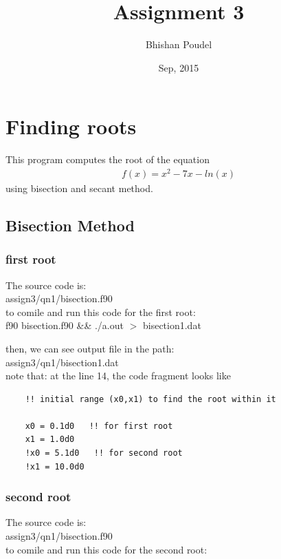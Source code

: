 \documentclass[11pt,a4paper,english]{article}
\title{Assignment 3}
\author{Bhishan Poudel}
\date{Sep, 2015}
\newcommand{\beqa}{\begin{eqnarray}}
\newcommand{\eeqa}{\end{eqnarray}}
\begin{document}
\maketitle
\tableofcontents
\listoffigures
\clearpage

\section{Finding roots}

	This program computes the root of the equation
	\beqa
	f(x)=x^2 - 7x -ln(x)
	\eeqa
	using bisection and secant method. \\
	
	\subsection{Bisection Method}
	\subsubsection{first root}
	
	The source code is:\\
	assign3/qn1/bisection.f90\\
	
	to comile and run this code for the first root:\\
	
	f90 bisection.f90 \&\& ./a.out $>$ bisection1.dat
	
	then, we can see output file in the path:\\
	assign3/qn1/bisection1.dat\\
	
	note that: at the line 14, the code fragment looks like
	\begin{verbatim}
	!! initial range (x0,x1) to find the root within it

    x0 = 0.1d0   !! for first root
    x1 = 1.0d0   
    !x0 = 5.1d0   !! for second root
    !x1 = 10.0d0
	\end{verbatim}
	
	\subsubsection{second root}
	
	The source code is:\\
	assign3/qn1/bisection.f90\\
	
	to comile and run this code for the second root:\\
	
\end{document}
